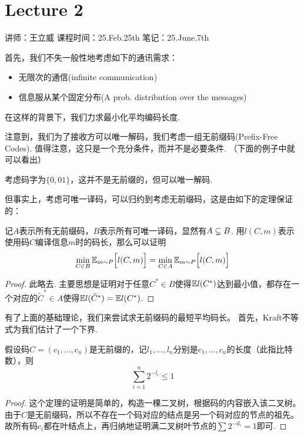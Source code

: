 \chapter{Lecture 2}

\begin{center}
    讲师：王立威 \qquad
    课程时间：25.Feb.25th \qquad 
    笔记：25.June.7th
\end{center}

\bigskip

首先，我们不失一般性地考虑如下的通讯需求：
\begin{itemize}
    \item 无限次的通信(infinite communication)
    \item 信息服从某个固定分布(A prob. distribution over the messages)
\end{itemize}

在这样的背景下，我们力求最小化平均编码长度. 

注意到，我们为了接收方可以唯一解码，我们考虑一组无前缀码(Prefix-Free Codes). 值得注意，这只是一个充分条件，而并不是必要条件.  （下面的例子中就可以看出）
\begin{example}
    考虑码字为$\{0, 01\}$，这并不是无前缀的，但可以唯一解码. 
\end{example}

但事实上，考虑可唯一译码，可以归约到考虑无前缀码，这是由如下的定理保证的：
\begin{theorem}
    记$A$表示所有无前缀码，$B$表示所有可唯一译码，显然有$A\subsetneq B$.  用$l(C,m)$表示使用码$C$编译信息$m$时的码长，那么可以证明 
    \[
    \min_{C\in B} \mathbb{E}_{m \sim P}\Big[l(C,m)\Big] = \min_{C\in A} \mathbb{E}_{m \sim P}\Big[l(C,m)\Big]
    \]
\end{theorem}
\begin{proof}
    此略去. 主要思想是证明对于任意$C^* \in B$使得$\mathbb{E} l(C^*)$达到最小值，都存在一个对应的$\tilde{C}^* \in A$使得$\mathbb{E} l(\tilde{C}^*) = \mathbb{E} l(C^*)$.  
\end{proof} 

有了上面的基础理论，我们来尝试求无前缀码的最短平均码长。 首先，Kraft不等式为我们估计了一个下界.
\begin{theorem}[无前缀码的Kraft不等式]
    假设码$C=(c_1,\dots,c_n)$是无前缀的，记$l_1,\dots, l_n$分别是$c_1,\dots, c_n$的长度（此指比特数），则 
    \[
    \sum_{i=1}^n 2^{-l_i} \le 1
    \]
\end{theorem} 
\begin{proof}
    这个定理的证明是简单的，构造一棵二叉树，根据码的内容嵌入该二叉树。由于$C$是无前缀码，所以不存在一个码对应的结点是另一个码对应的节点的祖先。故所有码$c_i$都在叶结点上，再归纳地证明满二叉树叶节点的$\sum 2^{-d_i} = 1$即可.
\end{proof}

